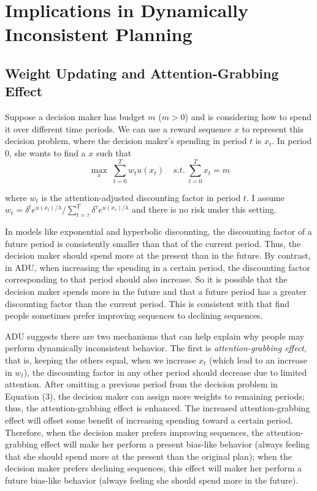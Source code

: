 \documentclass[
  12pt,
]{article}
\begin{document}
\hypertarget{implications-in-dynamically-inconsistent-planning}{%
\section{Implications in Dynamically Inconsistent
Planning}\label{implications-in-dynamically-inconsistent-planning}}

\hypertarget{weight-updating-and-attention-grabbing-effect}{%
\subsection{Weight Updating and Attention-Grabbing
Effect}\label{weight-updating-and-attention-grabbing-effect}}

Suppose a decision maker has budget \(m\) (\(m>0\)) and is considering
how to spend it over different time periods. We can use a reward
sequence \(x\) to represent this decision problem, where the decision
maker's spending in period \(t\) is \(x_t\). In period 0, she wants to
find a \(x\) such that\[ \tag{3}
\max_{x}\;\sum_{t=0}^T w_t u(x_t)\quad s.t. \;\sum_{t=0}^T x_t = m  
\]

where \(w_t\) is the attention-adjusted discounting factor in period
\(t\). I assume
\(w_t=\delta^t e^{u(x_t)/\lambda}/\sum_{t=\tau}^T \delta^{\tau} e^{u(x_\tau)/\lambda}\)
and there is no risk under this setting.

In models like exponential and hyperbolic discounting, the discounting
factor of a future period is consistently smaller than that of the
current period. Thus, the decision maker should spend more at the
present than in the future. By contrast, in ADU, when increasing the
spending in a certain period, the discounting factor corresponding to
that period should also increase. So it is possible that the decision
maker spends more in the future and that a future period has a greater
discounting factor than the current period. This is consistent with
\citet{loewenstein_preferences_1993} that find people sometimes prefer
improving sequences to declining sequences.

ADU suggests there are two mechanisms that can help explain why people
may perform dynamically inconsistent behavior. The first is
\emph{attention-grabbing effect}, that is, keeping the others equal,
when we increase \(x_t\) (which lead to an increase in \(w_t\)), the
discounting factor in any other period should decrease due to limited
attention. After omitting a previous period from the decision problem in
Equation (3), the decision maker can assign more weights to remaining
periods; thus, the attention-grabbing effect is enhanced. The increased
attention-grabbing effect will offset some benefit of increasing
spending toward a certain period. Therefore, when the decision maker
prefers improving sequences, the attention-grabbing effect will make her
perform a present bias-like behavior (always feeling that she should
spend more at the present than the original plan); when the decision
maker prefers declining sequences, this effect will maker her perform a
future bias-like behavior (always feeling she should spend more in the
future).
\end{document}
